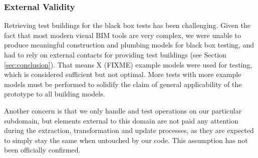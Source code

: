 \subsubsection{External Validity} Retrieving test buildings for the black box tests has been challenging. Given the fact that most modern visual BIM tools are very complex, we were unable to produce meaningful construction and plumbing models for black box testing, and had to rely on external contacts for providing test buildings (see Section \ref{sec:conclusion}). That means X (FIXME) example models were used for testing, which is considered sufficient but not optimal. More tests with more example models must be performed to solidify the claim of general applicability of the prototype to all building models.

Another concern is that we only handle and test operations on our particular subdomain, but elements external to this domain are not paid any attention during the extraction, transformation and update processes, as they are expected to simply stay the same when untouched by our code. This assumption has not been officially confirmed.







